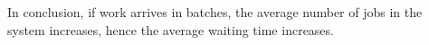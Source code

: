 \begin{exercise}
\begin{solution}
In conclusion, if work arrives in batches, the average number of jobs
in the system increases, hence the average waiting time increases.
\end{solution}
\end{exercise}







